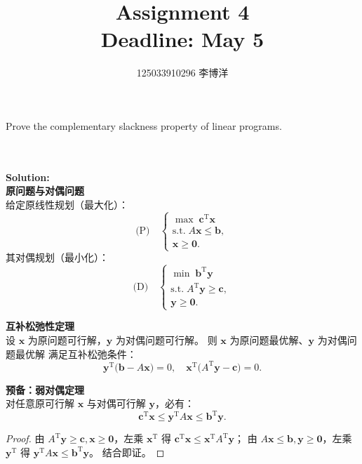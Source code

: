 \documentclass{article}
\title{{\bf Assignment 4} \\ {\large Deadline: May 5}}
\author{125033910296 李博洋}
\date{}
\newcounter{exercise}
\newcommand{\<}{
    \langle}
\renewcommand{\>}{
    \rangle}
\begin{document}
\maketitle


{\large

\begin{exercise}
	Prove the complementary slackness property of linear programs.
\end{exercise}
\\\\
\noindent\textbf{Solution:}
\\
\textbf{原问题与对偶问题}\\
给定原线性规划（最大化）：
\[
\text{(P)}\quad
\begin{cases}
\max\; \boldsymbol{c}^\mathrm{T}\boldsymbol{x} \\[4pt]
\text{s.t.}\; A\boldsymbol{x} \le \boldsymbol{b},\\[4pt]
\boldsymbol{x} \ge \boldsymbol{0}.
\end{cases}
\]
其对偶规划（最小化）：
\[
\text{(D)}\quad
\begin{cases}
\min\; \boldsymbol{b}^\mathrm{T}\boldsymbol{y} \\[4pt]
\text{s.t.}\; A^\mathrm{T}\boldsymbol{y} \ge \boldsymbol{c},\\[4pt]
\boldsymbol{y} \ge \boldsymbol{0}.
\end{cases}
\]

\noindent\textbf{互补松弛性定理}\\
设 $\boldsymbol{x}$ 为原问题可行解，$\boldsymbol{y}$ 为对偶问题可行解。
则 $\boldsymbol{x}$ 为原问题最优解、$\boldsymbol{y}$ 为对偶问题最优解
\iff 满足互补松弛条件：
\[
\boldsymbol{y}^\mathrm{T}\big(\boldsymbol{b}-A\boldsymbol{x}\big) = 0,\quad
\boldsymbol{x}^\mathrm{T}\big(A^\mathrm{T}\boldsymbol{y}-\boldsymbol{c}\big) = 0.
\]

\noindent\textbf{预备：弱对偶定理}\\
对任意原可行解 $\boldsymbol{x}$ 与对偶可行解 $\boldsymbol{y}$，必有：
\[
\boldsymbol{c}^\mathrm{T}\boldsymbol{x}
\le \boldsymbol{y}^\mathrm{T}A\boldsymbol{x}
\le \boldsymbol{b}^\mathrm{T}\boldsymbol{y}.
\]
\begin{proof}
由 $A^\mathrm{T}\boldsymbol{y}\ge \boldsymbol{c},\boldsymbol{x}\ge\boldsymbol 0$，左乘 $\boldsymbol{x}^\mathrm{T}$ 得
$\boldsymbol{c}^\mathrm{T}\boldsymbol{x} \le \boldsymbol{x}^\mathrm{T}A^\mathrm{T}\boldsymbol{y}$；
由 $A\boldsymbol{x}\le \boldsymbol{b},\boldsymbol{y}\ge\boldsymbol 0$，左乘 $\boldsymbol{y}^\mathrm{T}$ 得
$\boldsymbol{y}^\mathrm{T}A\boldsymbol{x} \le \boldsymbol{b}^\mathrm{T}\boldsymbol{y}$。
结合即证。
\end{proof}

}
\end{document}
